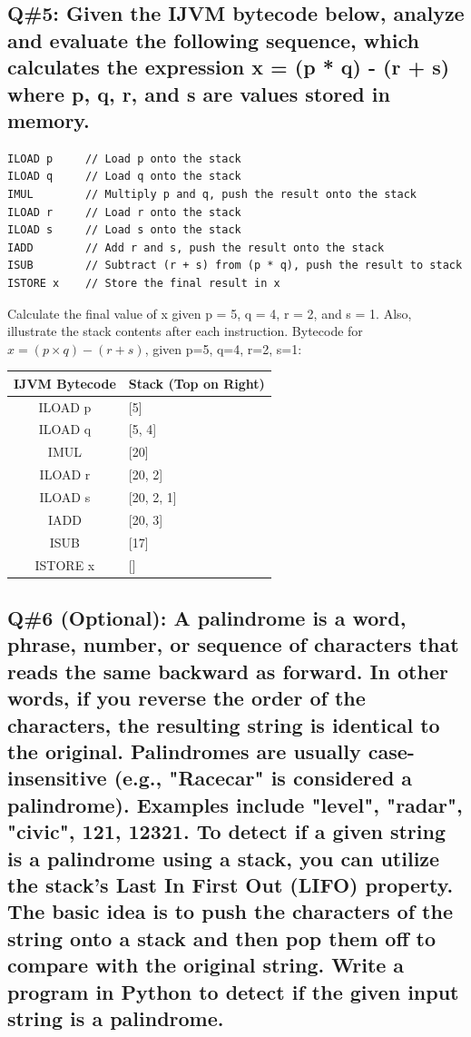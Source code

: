 \subsection*{Q\#5: Given the IJVM bytecode below, analyze and evaluate the following sequence, which calculates
the expression x = (p * q) - (r + s) where p, q, r, and s are values stored in memory.}
\begin{lstlisting}
ILOAD p     // Load p onto the stack 
ILOAD q     // Load q onto the stack 
IMUL        // Multiply p and q, push the result onto the stack 
ILOAD r     // Load r onto the stack 
ILOAD s     // Load s onto the stack 
IADD        // Add r and s, push the result onto the stack 
ISUB        // Subtract (r + s) from (p * q), push the result to stack 
ISTORE x    // Store the final result in x 
\end{lstlisting}
Calculate the final value of x given p = 5, q = 4, r = 2, and s = 1. Also, illustrate the stack contents after each instruction. Bytecode for $x = (p \times q) - (r + s)$, given p=5, q=4, r=2, s=1: 
\begin{center}
\begin{tabular}{|c|l|}
\hline
\textbf{IJVM Bytecode} & \textbf{Stack (Top on Right)} \\
\hline
ILOAD p & [5] \\
ILOAD q & [5, 4] \\
IMUL & [20] \\
ILOAD r & [20, 2] \\
ILOAD s & [20, 2, 1] \\
IADD & [20, 3] \\
ISUB & [17] \\
ISTORE x & [] \\
\hline
\end{tabular}
\end{center}

\subsection*{Q\#6 (Optional): A palindrome is a word, phrase, number, or sequence of characters that reads the
same backward as forward. In other words, if you reverse the order of the characters, the resulting
string is identical to the original. Palindromes are usually case-insensitive (e.g., "Racecar" is considered
a palindrome). Examples include "level", "radar", "civic", 121, 12321.
To detect if a given string is a palindrome using a stack, you can utilize the stack's Last In First Out
(LIFO) property. The basic idea is to push the characters of the string onto a stack and then pop them
off to compare with the original string. Write a program in Python to detect if the given input string is a
palindrome.}

